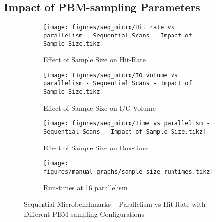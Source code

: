 \subsection{Impact of PBM-sampling Parameters}
\label{sec:eval_sample_size}


\begin{figure}
\centering
    \begin{subfigure}{0.45\textwidth}
        \centering
        \texttt{[image: figures/seq\_micro/Hit rate vs parallelism - Sequential Scans - Impact of Sample Size.tikz]}
        \caption{Effect of Sample Size on Hit-Rate}
        \label{fig:seq_micro_parallel_hitrate_samplesize}
    \end{subfigure}\hspace{0.05\textwidth}%
    \begin{subfigure}{0.45\textwidth}
        \centering
        \texttt{[image: figures/seq\_micro/IO volume vs parallelism - Sequential Scans - Impact of Sample Size.tikz]}
        \caption{Effect of Sample Size on I/O Volume}
        \label{fig:seq_micro_parallel_iovol_samplesize}
    \end{subfigure}
    
\vspace{20pt}
    \begin{subfigure}{0.45\textwidth}
        \centering
        \texttt{[image: figures/seq\_micro/Time vs parallelism - Sequential Scans - Impact of Sample Size.tikz]}
        \caption{Effect of Sample Size on Run-time}
        \label{fig:seq_micro_parallel_time_samplesize}
    \end{subfigure}\hspace{0.05\textwidth}%
    \begin{subfigure}{0.45\textwidth}
        \centering
        \texttt{[image: figures/manual\_graphs/sample\_size\_runtimes.tikz]}
        \caption{Run-times at 16 parallelism}
        \label{fig:seq_micro_bar_samplesize}
    \end{subfigure}
    \caption{Sequential Microbenchmarks -- Parallelism vs Hit Rate with Different PBM-sampling Configurations}
    \label{fig:seq_micro_parallel_samplingparams}
\end{figure}


